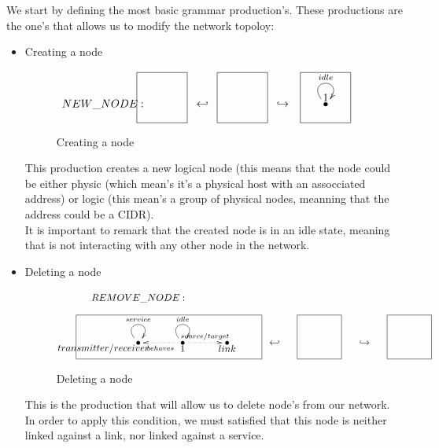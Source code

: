 \documentclass[envcountsect,runningheads]{llncs}
\begin{document}
We start by defining the most basic grammar production's. These 
productions are the one's that allows us to modify the network topoloy:


\begin{itemize}
  \item Creating a node
  \begin{figure}[H]
    \[
       \xymatrix@C=25pt@R=16pt
       {
         {}
         \POS[]-<4.5pc,0pc>\drop{NEW\_NODE:}
         \POS[]+<0pc,.5pc> *+=<3.8pc,3.8pc>[F-]{} & {\hookleftarrow} &
         {}
         \POS[]+<0pc,.5pc> *+=<3.8pc,3.8pc>[F-]{} & {\hookrightarrow} &
         {\bullet} \ar@(ul,ur)^{idle}
         \POS[]+<0pc,.5pc> *+=<3.8pc,3.8pc>[F-]{1} &
       }
    \]
    \caption{Creating a node}
    \protect\label{fig:nodecreation}
  \end{figure}
  This production creates a new logical node (this means that 
  the node could be either physic (which mean's it's a physical host with an 
  assocciated address) or logic (this mean's a group of physical nodes, meanning
  that the address could be a CIDR). \\
  It is important to remark that the created node is in an idle state, meaning 
  that is not interacting with any other node in the network. \\ 

  \item Deleting a node
  \begin{figure}[H]
    \[
       \xymatrix@C=35pt@R=16pt
       {
         {}\POS[]-<0pc,0pc>\drop{REMOVE\_NODE:}
         \\
         \\
         {\bullet} \ar@(ul,ur)^{service} \POS[]-<3pc,.5pc>\drop{transmitter/receiver}&
         {\bullet} \ar@(ul,ur)^{idle} \ar@{.>}^{behaves}[l]\ar@{.>}^{source/target}[r] \POS[]-<0pc,.5pc>\drop{1} &
         {\bullet} \POS[]-<0pc,.5pc>\drop{link}
         \POS[]+<-5pc,.5pc> *+=<16pc,3.8pc>[F-]{} & {\hookleftarrow} &
         {}
         \POS[]+<0pc,.5pc> *+=<3.8pc,3.8pc>[F-]{} & {\hookrightarrow} &
         {}
         \POS[]+<0pc,.5pc> *+=<3.8pc,3.8pc>[F-]{} &
       }
    \]
    \caption{Deleting a node}
    \protect\label{fig:nodedeletion}
  \end{figure}
  This is the production that will allow us to delete node's from our network. \\ 
  In order to apply this condition, we must satisfied that this node is neither 
  linked against a link, nor linked against a service.\\
  

\end{itemize}
\end{document}
